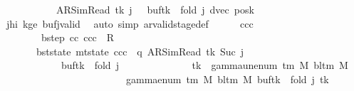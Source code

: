 \begin{isabellebody}
\ \ \ \ \ \ \ \ \ \ \ {\isacharparenleft}{\kern0pt}AR{\isacharunderscore}{\kern0pt}SimRead{\isacharcomma}{\kern0pt}\ tk{\isacharcomma}{\kern0pt}\ j\ {\isacharplus}{\kern0pt}\ {}{\isacharcomma}{\kern0pt}\ buf{}{\isacharparenleft}{\kern0pt}tk\ {\isacharcolon}{\kern0pt}{\isacharequal}{\kern0pt}\ {\isacharquery}{\kern0pt}fold\ j{\isacharparenright}{\kern0pt}{\isacharcomma}{\kern0pt}\ dvec{\isacharcomma}{\kern0pt}\ posk{\isacharparenright}{\kern0pt}{\isachardoublequoteclose}\isanewline
\ \ \ \ \ \ \isamarkupfalse%
\ jhi\ kge{}\ bufj{\isacharunderscore}{\kern0pt}valid\ \isamarkupfalse%
\ {\isacharparenleft}{\kern0pt}auto\ simp{\isacharcolon}{\kern0pt}\ ar{\isacharunderscore}{\kern0pt}valid{\isacharunderscore}{\kern0pt}stage{\isacharunderscore}{\kern0pt}def{\isacharparenright}{\kern0pt}\isanewline
\ \ \ \ \isamarkupfalse%
\ ccc\ \isanewline
\ \ \ \ \ \ \ \ bstep{\isacharcolon}{\kern0pt}\ {\isachardoublequoteopen}{\isacharparenleft}{\kern0pt}cc{\isacharcomma}{\kern0pt}\ ccc{\isacharparenright}{\kern0pt}\ {\isasymin}\ R{\isacharprime}{\kern0pt}{\isachardoublequoteclose}\isanewline
\ \ \ \ \ \ \ bst{\isacharunderscore}{\kern0pt}state{\isacharcolon}{\kern0pt}\ {\isachardoublequoteopen}mt{\isacharunderscore}{\kern0pt}state\ ccc\ {\isacharequal}{\kern0pt}\ {\isacharparenleft}{\kern0pt}q{\isacharcomma}{\kern0pt}\ AR{\isacharunderscore}{\kern0pt}SimRead{\isacharcomma}{\kern0pt}\ tk{\isacharcomma}{\kern0pt}\ Suc\ {\isacharparenleft}{\kern0pt}j\ {\isacharplus}{\kern0pt}\ {}{\isacharparenright}{\kern0pt}{\isacharcomma}{\kern0pt}\isanewline
\ \ \ \ \ \ \ \ \ \ \ \ {\isacharparenleft}{\kern0pt}buf{}{\isacharparenleft}{\kern0pt}tk\ {\isacharcolon}{\kern0pt}{\isacharequal}{\kern0pt}\ {\isacharquery}{\kern0pt}fold\ j{\isacharparenright}{\kern0pt}{\isacharparenright}{\kern0pt}\isanewline
\ \ \ \ \ \ \ \ \ \ \ \ \ \ {\isacharparenleft}{\kern0pt}tk\ {\isacharcolon}{\kern0pt}{\isacharequal}{\kern0pt}\ gamma{\isacharunderscore}{\kern0pt}unenum\ {\isacharparenleft}{\kern0pt}{\isasymGamma}{\isacharunderscore}{\kern0pt}tm\ M{\isacharparenright}{\kern0pt}\ {\isacharparenleft}{\kern0pt}bl{\isacharunderscore}{\kern0pt}tm\ M{\isacharparenright}{\kern0pt}\isanewline
\ \ \ \ \ \ \ \ \ \ \ \ \ \ \ \ \ \ \ \ \ \ \ {\isacharparenleft}{\kern0pt}{}\ {\isacharasterisk}{\kern0pt}\ gamma{\isacharunderscore}{\kern0pt}enum\ {\isacharparenleft}{\kern0pt}{\isasymGamma}{\isacharunderscore}{\kern0pt}tm\ M{\isacharparenright}{\kern0pt}\ {\isacharparenleft}{\kern0pt}bl{\isacharunderscore}{\kern0pt}tm\ M{\isacharparenright}{\kern0pt}\ {\isacharparenleft}{\kern0pt}{\isacharparenleft}{\kern0pt}buf{}{\isacharparenleft}{\kern0pt}tk\ {\isacharcolon}{\kern0pt}{\isacharequal}{\kern0pt}\ {\isacharquery}{\kern0pt}fold\ j{\isacharparenright}{\kern0pt}{\isacharparenright}{\kern0pt}\ tk{\isacharparenright}{\kern0pt}\isanewline

\end{isabellebody}
